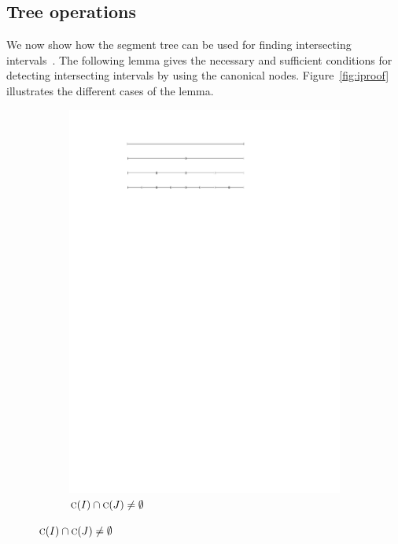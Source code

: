 \documentclass[english,gradu]{tktltiki2018}
\begin{document}
\subsection{Tree operations}\label{sec:treeops}

We now show how the segment tree can be used for finding intersecting intervals~\cite[Chapter 10]{berg2008}.
The following lemma gives the necessary and sufficient conditions for detecting intersecting intervals by using the canonical nodes.
Figure~\ref{fig:iproof} illustrates the different cases of the lemma.

\begin{figure}\centering
	\begin{subfigure}[t]{0.32\textwidth}\centering
		\includegraphics[width=\textwidth,page=3]{fig/iproof}
		\caption{$\textsc{c}(I)\cap\textsc{c}(J)\neq\emptyset$}\label{fig:iproof:common}
	\end{subfigure}

\end{figure}
\end{document}
